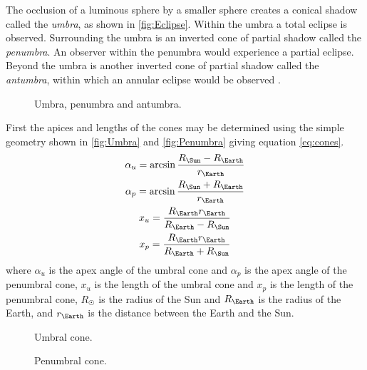 The occlusion of a luminous sphere by a smaller sphere creates a conical shadow called the \emph{umbra}, as shown in \autoref{fig:Eclipse}. Within the umbra a total eclipse is observed. Surrounding the umbra is an inverted cone of partial shadow called the \emph{penumbra}. An observer within the penumbra would experience a partial eclipse. Beyond the umbra is another inverted cone of partial shadow called the \emph{antumbra}, within which an annular eclipse would be observed \parencite{Longo1995}.

\begin{figure}
\caption{Umbra, penumbra and antumbra.} \label{fig:Eclipse}
\centering
\def\svgwidth{0.85\textwidth}

\end{figure}

First the apices and lengths of the cones may be determined using the simple geometry shown in \autoref{fig:Umbra} and \autoref{fig:Penumbra} giving equation \eqref{eq:cones}.
\begin{subequations} \label{eq:cones}
\begin{gather}
\alpha_u = \arcsin\frac{R_\Sun-R_\Earth}{r_\Earth} \\
\alpha_p = \arcsin\frac{R_\Sun+R_\Earth}{r_\Earth} \\
x_u = \frac{R_\Earth r_\Earth}{R_\Earth-R_\Sun} \\
x_p = \frac{R_\Earth r_\Earth}{R_\Earth+R_\Sun}
\end{gather}
\end{subequations}
where $\alpha_u$ is the apex angle of the umbral cone and $\alpha_p$ is the apex angle of the penumbral cone, $x_u$ is the length of the umbral cone and $x_p$ is the length of the penumbral cone, $R_\Sun$ is the radius of the Sun and $R_\Earth$ is the radius of the Earth, and $r_\Earth$ is the distance between the Earth and the Sun.

\begin{figure}
\caption{Umbral cone.} \label{fig:Umbra}
\centering
\def\svgwidth{0.6\textwidth}

\end{figure}

\begin{figure}
\caption{Penumbral cone.} \label{fig:Penumbra}
\centering
\def\svgwidth{0.6\textwidth}

\end{figure}


